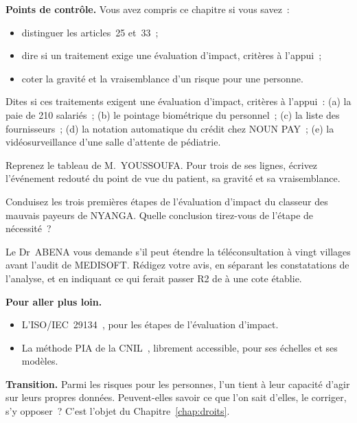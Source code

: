 \begin{boxinfo}
\textbf{Points de contrôle.} Vous avez compris ce chapitre si vous savez~:
\begin{itemize}
    \item distinguer les articles~25 et~33~;
    \item dire si un traitement exige une évaluation d'impact, critères à
          l'appui~;
    \item coter la gravité et la vraisemblance d'un risque pour une
          personne.
\end{itemize}
\end{boxinfo}

\begin{boxexo}[title={\ding{45}\quad Exercice~10.1. Évaluation d'impact ou non \niveaubase}]
Dites si ces traitements exigent une évaluation d'impact, critères à
l'appui~: (a) la paie de 210 salariés~; (b) le pointage biométrique du
personnel~; (c) la liste des fournisseurs~; (d) la notation automatique du
crédit chez NOUN PAY~; (e) la vidéosurveillance d'une salle d'attente de
pédiatrie.
\end{boxexo}

\begin{boxexo}[title={\ding{45}\quad Exercice~10.2. Réécrire le tableau \niveaumoyen}]
Reprenez le tableau de M.~YOUSSOUFA. Pour trois de ses lignes, écrivez
l'événement redouté du point de vue du patient, sa gravité et sa
vraisemblance.
\end{boxexo}

\begin{boxexo}[title={\ding{45}\quad Exercice~10.3. Le classeur des mauvais payeurs \niveaumoyen}]
Conduisez les trois premières étapes de l'évaluation d'impact du classeur
des mauvais payeurs de NYANGA. Quelle conclusion tirez-vous de l'étape de
nécessité~?
\end{boxexo}

\begin{boxexo}[title={\ding{45}\quad Exercice~10.4. Un risque inconnu \niveauexpert}]
Le Dr~ABENA vous demande s'il peut étendre la téléconsultation à vingt
villages avant l'audit de MEDISOFT. Rédigez votre avis, en séparant les
constatations de l'analyse, et en indiquant ce qui ferait passer R2 de
\NEK{} à une cote établie.
\end{boxexo}

\bigskip

\begin{boxinfo}
\textbf{Pour aller plus loin.}
\begin{itemize}
    \item L'ISO/IEC~29134~\cite{iso29134}, pour les étapes de l'évaluation
          d'impact.
    \item La méthode PIA de la CNIL~\cite{cnil2018pia}, librement
          accessible, pour ses échelles et ses modèles.
\end{itemize}
\end{boxinfo}

\begin{boxinfo}
\textbf{Transition.} Parmi les risques pour les personnes, l'un tient à leur
capacité d'agir sur leurs propres données. Peuvent-elles savoir ce que l'on
sait d'elles, le corriger, s'y opposer~? C'est l'objet du
Chapitre~\ref{chap:droits}.
\end{boxinfo}
